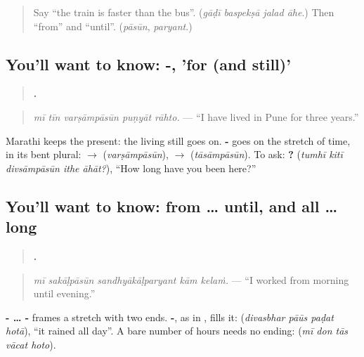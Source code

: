 \label{lesson:MR-C285-varshanpasun}



\begin{quote}
Say \textquotedblleft{}the train is faster than the bus\textquotedblright{}. (\emph{gāḍī baspekṣā jalad āhe}.) Then \textquotedblleft{}from\textquotedblright{} and \textquotedblleft{}until\textquotedblright{}. (\emph{pāsūn}, \emph{paryant}.)
\end{quote}

\subsection*{You'll want to know: -, 'for (and still)'}
\begin{quote}
\textbf{    .}
\end{quote}

\begin{quote}
\emph{mī tīn varṣāmpāsūn puṇyāt rāhto.} — \textquotedblleft{}I have lived in Pune for three years.\textquotedblright{}
\end{quote}

Marathi keeps the present: the living still goes on. \textbf{-} goes on the stretch of time, in its bent plural: \textbf{} $\to$ \textbf{} (\emph{varṣāmpāsūn}), \textbf{} $\to$ \textbf{} (\emph{tāsāmpāsūn}). To ask: \textbf{    ?} (\emph{tumhī kitī divsāmpāsūn ithe āhāt?}), \textquotedblleft{}How long have you been here?\textquotedblright{}

\subsection*{You'll want to know: from … until, and all … long}
\begin{quote}
\textbf{    .}
\end{quote}

\begin{quote}
\emph{mī sakāḷpāsūn sandhyākāḷparyant kām kelaṁ.} — \textquotedblleft{}I worked from morning until evening.\textquotedblright{}
\end{quote}

\textbf{- … -} frames a stretch with two ends. \textbf{-}, as in \textbf{}, fills it: \textbf{   } (\emph{divasbhar pāūs paḍat hotā}), \textquotedblleft{}it rained all day\textquotedblright{}. A bare number of hours needs no ending: \textbf{    } (\emph{mī don tās vācat hoto}).


